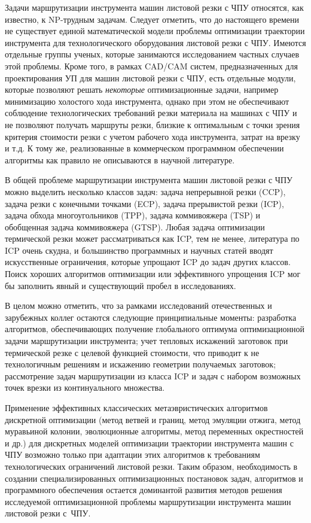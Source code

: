 Задачи маршрутизации инструмента машин листовой резки с ЧПУ относятся,
как известно,
к
NP-трудным задачам.
Следует отметить,
что до настоящего времени не существует единой математической модели
проблемы оптимизации траектории инструмента для технологического оборудования листовой резки с ЧПУ.
Имеются отдельные группы ученых, которые занимаются исследованием частных случаев этой проблемы.
Кроме того, в рамках CAD/CAM систем,
предназначенных для проектирования УП для машин листовой резки с ЧПУ,
есть отдельные модули, которые позволяют решать
\textit{некоторые} оптимизационные задачи,
например минимизацию холостого хода инструмента,
однако при этом не обеспечивают соблюдение технологических требований резки материала на машинах с ЧПУ
и не позволяют получать маршруты резки,
близкие к оптимальным с точки зрения критерия стоимости резки с учетом рабочего хода инструмента,
затрат на врезку и т.д.
К тому же, реализованные в коммерческом программном обеспечении алгоритмы
как правило не описываются в научной литературе.

В общей проблеме маршрутизации инструмента машин листовой резки с ЧПУ
можно выделить несколько классов задач:
задача непрерывной резки (CCP),
задача резки с конечными точками (ECP),
задача прерывистой резки (ICP),
задача обхода многоугольников (TPP),
задача коммивояжера (TSP)
и обобщенная задача коммивояжера (GTSP).
Любая задача оптимизации термической резки может рассматриваться как ICP,
тем не менее, литература по ICP очень скудна,
и большинство программных и научных статей вводят искусственные ограничения,
которые упрощают ICP до задач других классов.
Поиск хороших алгоритмов оптимизации или эффективного упрощения ICP
мог бы заполнить явный и существующий пробел в исследованиях.

В целом можно отметить,
что за рамками исследований отечественных и зарубежных коллег остаются следующие принципиальные моменты:
  разработка алгоритмов, обеспечивающих получение глобального оптимума
  оптимизационной задачи маршрутизации инструмента;
  учет тепловых искажений заготовок при термической резке
  с целевой функцией стоимости, что приводит к не технологичным решениям
  и искажению геометрии получаемых заготовок;
  рассмотрение задач маршрутизации из класса ICP
  и задач с набором возможных точек врезки из континуального множества.

Применение эффективных классических метаэвристических алгоритмов дискретной оптимизации
(метод ветвей и границ, метод эмуляции отжига, метод муравьиной колонии, эволюционные алгоритмы, метод переменных окрестностей и др.)
для дискретных моделей оптимизации траектории инструмента машин с ЧПУ
возможно только при адаптации этих алгоритмов к требованиям технологических ограничений листовой резки.
Таким образом,
необходимость в создании специализированных оптимизационных постановок задач,
алгоритмов и программного обеспечения остается
доминантой развития методов решения исследуемой оптимизационной проблемы
маршрутизации инструмента машин листовой резки с~ЧПУ.

